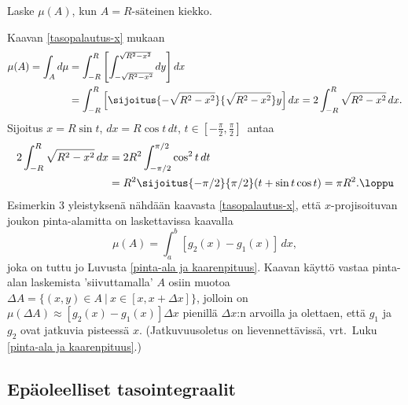 \endgroup
\begin{Exa} Laske $\mu(A)$, kun $A=\text{$R$-säteinen kiekko}$.
\end{Exa}
\ratk Kaavan \eqref{tasopalautus-x} mukaan
\begin{align*}
\mu(A) = \int_A d\mu 
      &= \int_{-R}^R \left[\int_{-\sqrt{R^2-x^2}}^{\sqrt{R^2-x^2}} dy\right] dx \\
      &= \int_{-R}^R \left[\sijoitus{-\sqrt{R^2-x^2}}{\sqrt{R^2-x^2}} y \right] dx
       = 2\int_{-R}^R \sqrt{R^2-x^2}\,dx.
\end{align*}
Sijoitus $x=R\sin t$, $dx=R\cos t\, dt$, $t\in [-\frac{\pi}{2},\frac{\pi}{2}]\,$ antaa 
\begin{align*}
2\int_{-R}^R \sqrt{R^2-x^2}\,dx &= 2R^2\int_{-\pi/2}^{\pi/2}\cos^2 t\,dt \\
                               &= R^2\sijoitus{-\pi/2}{\pi/2}(t+\sin t\cos t) 
                               = \pi R^2. \loppu
\end{align*}
Esimerkin 3 yleistyksenä nähdään kaavasta \eqref{tasopalautus-x}, että $x$-projisoituvan joukon
pinta-alamitta on laskettavissa kaavalla
\[
\mu(A)=\int_a^b [g_2(x)-g_1(x)]\,dx,
\]
joka on tuttu jo Luvusta \ref{pinta-ala ja kaarenpituus}. Kaavan käyttö vastaa pinta-alan
laskemista 'siivuttamalla' $A$ osiin muotoa 
$\Delta A=\{(x,y)\in A \ | \ x\in [x,x+\Delta x]\}$, jolloin on
$\mu(\Delta A) \approx [g_2(x)-g_1(x)]\Delta x$ pienillä $\Delta x$:n arvoilla ja olettaen,
että $g_1$ ja $g_2$ ovat jatkuvia pisteessä $x$. (Jatkuvuusoletus on lievennettävissä, vrt.\
Luku \ref{pinta-ala ja kaarenpituus}.)

\begin{figure}[H]
\begin{center}

\end{center}
\end{figure}

\subsection{Epäoleelliset tasointegraalit}


